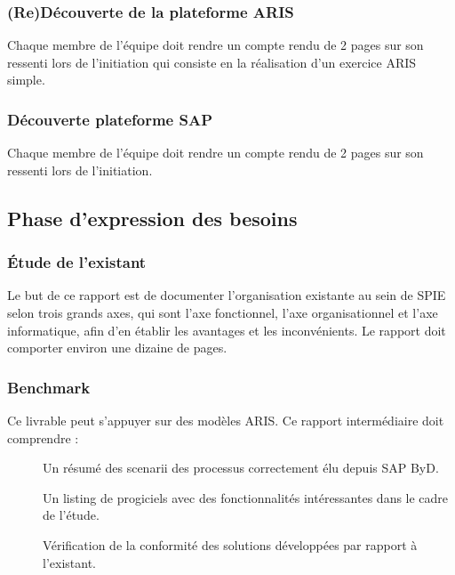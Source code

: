\subsubsection{(Re)Découverte de la plateforme ARIS}

Chaque membre de l’équipe doit rendre un compte rendu de 2 pages sur son ressenti lors de l’initiation qui consiste en la réalisation d’un exercice ARIS simple.

\subsubsection{Découverte plateforme SAP}

Chaque membre de l’équipe doit rendre un compte rendu de 2 pages sur son ressenti lors de l’initiation.

\subsection{Phase d’expression des besoins}

\subsubsection{Étude de l'existant}

Le but de ce rapport est de documenter l’organisation existante au sein de SPIE selon trois grands axes, qui sont l’axe fonctionnel, l’axe organisationnel et l’axe informatique, afin d’en établir les avantages et les inconvénients.\newline
Le rapport doit comporter environ une dizaine de pages.

\subsubsection{Benchmark}

Ce livrable peut s'appuyer sur des modèles ARIS. Ce rapport intermédiaire doit comprendre : \\

\begin{description}
    \item[\textbullet] Un résumé des scenarii des processus correctement élu depuis SAP ByD.
    \item[\textbullet] Un listing de progiciels avec des fonctionnalités intéressantes dans le cadre de l’étude.
    \item[\textbullet] Vérification de la conformité des solutions développées par rapport à l’existant.
\end{description}

